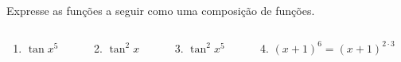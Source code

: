 \begin{frame}
  \begin{example}
    Expresse as funções a seguir como uma composição de funções.
    \begin{columns}[onlytextwidth]
        \begin{column}{0.2\textwidth}\vspace*{-0.4cm}
          \begin{enumerate}
            \item $\tan{x^{5}}$
          \end{enumerate}
        \end{column}
        \begin{column}{0.2\textwidth}\vspace*{-0.4cm}
          \begin{enumerate}
            \setcounter{enumi}{1}
            \item $\tan^{2}{x}$
          \end{enumerate}
        \end{column}
        \begin{column}{0.2\textwidth}\vspace*{-0.4cm}
          \begin{enumerate}
            \setcounter{enumi}{2}
            \item $\tan^{2}{x^{5}}$
          \end{enumerate}
        \end{column}
        \begin{column}{0.4\textwidth}\vspace*{-0.4cm}
          \begin{enumerate}
            \setcounter{enumi}{3}
            \item $(x+1)^{6}=(x+1)^{2\cdot 3}$
          \end{enumerate}
        \end{column}
      \end{columns}
  \end{example}
\end{frame}

